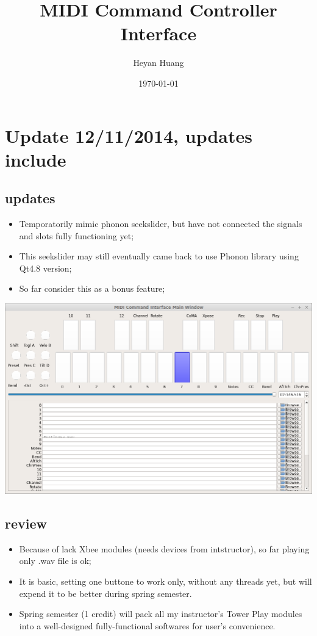 \documentclass[9pt,b5paper]{article}
\author{Heyan Huang}
\date{\today}
\title{MIDI Command Controller Interface}
\begin{document}
\maketitle
\tableofcontents


\section{Update 12/11/2014, updates include}
\label{sec-1}
\subsection{updates}
\label{sec-1-1}
\begin{itemize}
\item Temporatorily mimic phonon seekslider, but have not connected the signals and slots fully functioning yet;
\item This seekslider may still eventually came back to use Phonon library using Qt4.8 version;
\item So far consider this as a bonus feature;
\end{itemize}
\includegraphics[width=.9\linewidth]{./pic/Screenshot_from_2014-12-11_13:33:46.png}
\subsection{review}
\label{sec-1-2}
\begin{itemize}
\item Because of lack Xbee modules (needs devices from intstructor), so far playing only .wav file is ok;
\item It is basic, setting one buttone to work only, without any threads yet, but will expend it to be better during spring semester.
\item Spring semester (1 credit) will pack all my instructor's Tower Play modules into a well-designed fully-functional softwares for user's convenience.
\end{itemize}
\end{document}
